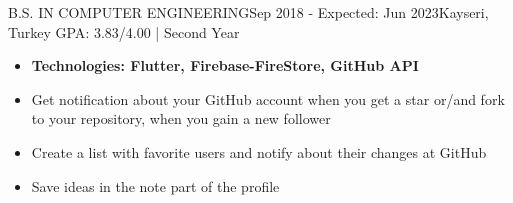 \documentclass[10pt,a4paper]{altacv}
\begin{document}

\begin{fullwidth}
\makecvheader
\end{fullwidth}


 {\textcolor{body}{B.S. IN COMPUTER ENGINEERING}}{Sep 2018 - Expected: Jun 2023}{Kayseri, Turkey} 
\textsc{GPA}: 3.83/4.00 \hspace{5}|\hspace{5} Second Year

\divider


\cvsection{\textcolor{Red}{Projects}} 
\begin{itemize}
\item \textbf{Technologies: Flutter, Firebase-FireStore, GitHub API}
\item Get notification about your GitHub account when you get a star or/and fork to your repository, when you gain a new follower
\item Create a list with favorite users and notify about their changes at GitHub
\item Save ideas in the note part of the profile
\end{itemize}
\end{document}
